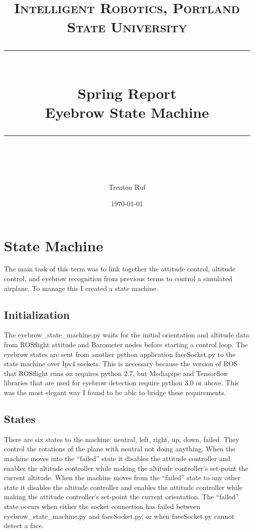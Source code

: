 \documentclass[11pt]{scrartcl} %
\title{	
	\normalfont\normalsize
	\textsc{Intelligent Robotics, Portland State University}\\ %
	\vspace{25pt} %
	\rule{\linewidth}{0.5pt}\\ %
	\vspace{20pt} %
	{\huge Spring Report}\\ %
	\vspace{4pt} %
	{\large Eyebrow State Machine}\\ %
	\vspace{12pt} %
	\rule{\linewidth}{2pt}\\ %
	\vspace{12pt} %
}
\author{\LARGE Trenton Ruf} %
\date{\normalsize \today} %
\begin{document}
\maketitle %




\renewcommand\thesubsection{\Roman{subsection}}
\section{State Machine} 

The main task of this term was to link together the attitude control, altitude control, and eyebrow recognition from previous terms to control a simulated airplane. To manage this I created a state machine.


\subsection{Initialization}
The eyebrow\_state\_machine.py waits for the initial orientation and altitude data from ROSflight attitude and Barometer nodes before starting a control loop. The eyebrow states are sent from another python application faceSocket.py to the state machine over Ipv4 sockets. This is necessary because the version of ROS that ROSflight runs on requires python 2.7, but Mediapipe and Tensorflow libraries that are used for eyebrow detection require python 3.0 or above. This was the most elegant way I found to be able to bridge these requirements. 


\subsection{States}
There are six states to the machine: neutral, left, right, up, down, failed. They control the rotations of the plane with neutral not doing anything. When the machine moves into the “failed” state it disables the attitude controller and enables the altitude controller while making the altitude controller’s set-point the current altitude. When the machine moves from the “failed” state to any other state it disables the altitude controller and enables the attitude controller while making the attitude controller’s set-point the current orientation. The “failed” state occurs when either the socket connection has failed between eyebrow\_state\_machine.py and faceSocket.py, or when faceSocket.py cannot detect a face.
\end{document}
